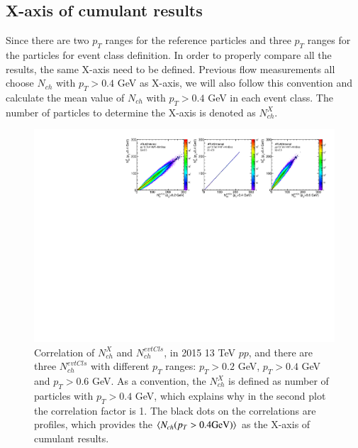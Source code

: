 \subsection{X-axis of cumulant results}
Since there are two $p_{T}$ ranges for the reference particles and three $p_{T}$ ranges for the particles for event class definition. In order to properly compare all the results, the same X-axis need to be defined. Previous flow measurements all choose $N_{ch}$ with $p_{T}>0.4$ GeV as X-axis, we will also follow this convention and calculate the mean value of $N_{ch}$ with $p_{T}>0.4$ GeV in each event class. The number of particles to determine the X-axis is denoted as $N_{ch}^{X}$.

\begin{figure}[H]
\centering
\includegraphics[width=1.\linewidth]{figs/sec_ana/mon_pp13_2015_trkXaxis.pdf}
\caption{Correlation of $N_{ch}^{X}$ and $N_{ch}^{evtCls}$, in 2015 13 TeV $pp$, and there are three $N_{ch}^{evtCls}$ with different $p_{T}$ ranges: $p_{T}>0.2$ GeV, $p_{T}>0.4$ GeV and $p_{T}>0.6$ GeV. As a convention, the $N_{ch}^{X}$ is defined as number of particles with $p_{T}>0.4$ GeV, which explains why in the second plot the correlation factor is 1. The black dots on the correlations are profiles, which provides the $\left\langle N_{ch} (p_{T}>0.4 \text{GeV})\right\rangle$ as the X-axis of cumulant results.}
\label{fig:mon_pp13_2015_trkXaxis}
\end{figure}
